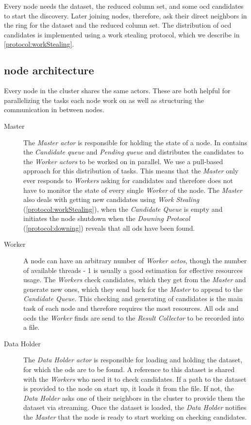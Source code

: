   Every node needs the dataset, the reduced column set, and some \gls{ocd} candidates to start the discovery.
  Later joining nodes, therefore, ask their direct neighbors in the ring for the dataset and the reduced column set.
  The distribution of \gls{ocd} candidates is implemented using a work stealing protocol, which we describe in \cref{protocol:workStealing}.

\subsection{\dodo{} node architecture}\label{sec:node-architecture}
Every node in the cluster shares the same actors.
These are both helpful for parallelizing the tasks each node work on as well as structuring the communication in between nodes.

\begin{description}
  \item[Master]
  The \emph{Master actor} is responsible for holding the state of a node.
  In contains the \emph{Candidate queue} and \emph{Pending queue} and distributes the candidates to the \emph{Worker actors} to be worked on in parallel. 
  We use a pull-based approach for this distribution of tasks.
  This means that the \emph{Master} only ever responds to \emph{Workers} asking for candidates and therefore does not have to monitor the state of every single \emph{Worker} of the node.
  The \emph{Master} also deals with getting new candidates using \emph{Work Stealing} (\cref{protocol:workStealing}), when the \emph{Candidate Queue} is empty and initiates the node shutdown when the \emph{Downing Protocol} (\cref{protocol:downing}) reveals that all \glspl{od} have been found.
  
  \item[Worker]
  A node can have an arbitrary number of \emph{Worker actos}, though the number of available threads - 1 is usually a good estimation for effective resources usage.
  The \emph{Workers} check candidates, which they get from the \emph{Master} and generate new ones, which they send back for the \emph{Master} to append to the \emph{Candidate Queue}.
  This checking and generating of candidates is the main task of each node and therefore requires the most resources.
  All \glspl{od} and \glspl{ocd} the \emph{Worker} finds are send to the \emph{Result Collector} to be recorded into a file. 
  
  \item[Data Holder]
  The \emph{Data Holder actor} is responsible for loading and holding the dataset, for which the \glspl{od} are to be found. 
  A reference to this dataset is shared with the \emph{Workers} who need it to check candidates.
  If a path to the dataset is provided to the node on start up, it loads it from the file.
  If not, the \emph{Data Holder} asks one of their neighbors in the cluster to provide them the dataset via streaming.
  Once the dataset is loaded, the \emph{Data Holder} notifies the \emph{Master} that the node is ready to start working on checking candidates. 
  

\end{description}
